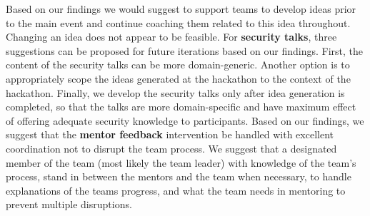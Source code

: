 \documentclass[runningheads]{llncs}
\begin{document}
Based on our findings we would suggest to support teams to develop ideas prior to the main event and continue coaching them related to this idea throughout. Changing an idea does not appear to be feasible.
For \textbf{security talks}, three suggestions can be proposed for future iterations based on our findings.
First, the content of the security talks can be more domain-generic. Another option is to appropriately scope the ideas generated at the hackathon to the context of the hackathon. Finally, we develop the security talks only after idea generation is completed, so that the talks are more domain-specific and have maximum effect of offering adequate security knowledge to participants.
Based on our findings, we suggest that the \textbf{mentor feedback} intervention be handled with excellent coordination not to disrupt the team process. 
We suggest that a designated member of the team (most likely the team leader) with knowledge of the team's process, stand in between the mentors and the team when necessary, to handle explanations of the teams progress, and what the team needs in mentoring to prevent multiple disruptions.
\end{document}
